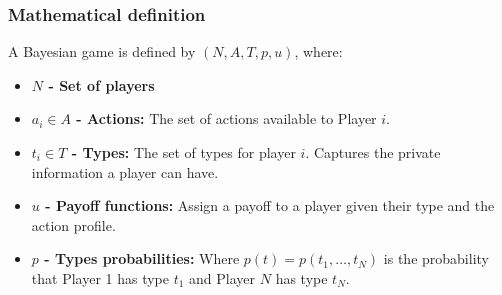 \documentclass[11pt]{beamer}
\begin{document}
\begin{frame}
{    \vspace{5mm}
    }
    
    
\end{frame} 



\begin{frame}
    \frametitle{Mathematical definition}

    A Bayesian game is defined by $(N,A,T,p,u)$, where:
    
    \vspace{5mm}
    \begin{itemize}
        \item \textbf{$N$ - Set of players}
        \vspace{2mm}
        \item \textbf{$a_i \in A$ - Actions:} The set of actions available to Player $i$.
        \vspace{2mm}
        \item \textbf{$t_i \in T$ - Types:} The set of types for player $i$. Captures the private information a player can have.
        \vspace{2mm}
        \item \textbf{$u$ - Payoff functions:} Assign a payoff to a player given their type and the action profile.
        \vspace{2mm}
        \item \textbf{$p$ - Types probabilities:} Where $p(t) = p(t_1, \ldots, t_N)$ is the probability that Player 1 has type $t_1$ and Player $N$ has type $t_N$.
    \end{itemize}

\end{frame}
\end{document}
